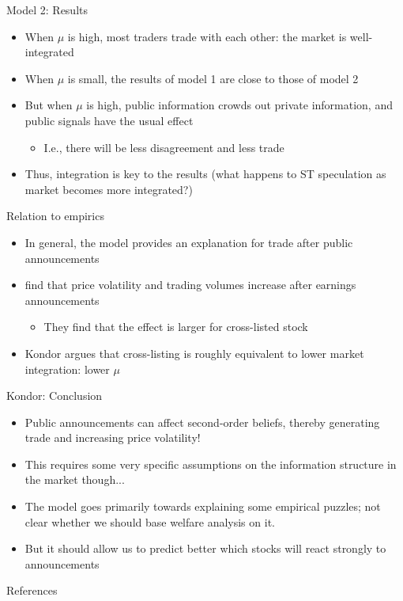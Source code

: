 \documentclass[english,10pt
,aspectratio=169
]{beamer}
\begin{document}
\begin{frame}{Model 2: Results}
	\begin{itemize}
		\item When $\mu$ is high, most traders trade with each other: the market is well-integrated
		\item When $\mu$ is small, the results of model 1 are close to those of model 2
		\item But when $\mu$ is high, public information crowds out private information, and public signals have the usual effect
		\begin{itemize}
			\item I.e., there will be less disagreement and less trade
		\end{itemize}
		\item Thus, integration is key to the results (what happens to ST speculation as market becomes more integrated?)
	\end{itemize}
\end{frame}


\begin{frame}{Relation to empirics}
	\begin{itemize}
		\item In general, the model provides an explanation for trade after public announcements
		\item \citet*{bailey_economic_2006} find that price volatility and trading volumes increase after earnings announcements
		\begin{itemize}
			\item They find that the effect is larger for cross-listed stock
		\end{itemize}
		\item Kondor argues that cross-listing is roughly equivalent to lower market integration: lower $\mu$
	\end{itemize}
\end{frame}


\begin{frame}{Kondor: Conclusion}
	\begin{itemize}
		\item Public announcements can affect second-order beliefs, thereby generating trade and increasing price volatility!
		\item This requires some very specific assumptions on the information structure in the market though...
		\item The model goes primarily towards explaining some empirical puzzles; not clear whether we should base welfare analysis on it.
		\item But it should allow us to predict better which stocks will react strongly to announcements
	\end{itemize}
\end{frame}

\appendix
\begin{frame}[allowframebreaks]{References}
	
	
\end{frame}
\end{document}
